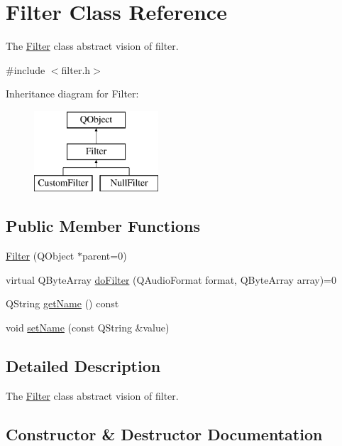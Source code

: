 \hypertarget{class_filter}{}\section{Filter Class Reference}
\label{class_filter}


The \hyperlink{class_filter}{Filter} class  abstract vision of filter.  




{\ttfamily \#include $<$filter.\+h$>$}

Inheritance diagram for Filter\+:\begin{figure}[H]
\begin{center}
\leavevmode
\includegraphics[height=3.000000cm]{class_filter}
\end{center}
\end{figure}
\subsection*{Public Member Functions}
\begin{DoxyCompactItemize}
\item 
\hyperlink{class_filter_a63401236b02925be21f62de930864aa7}{Filter} (Q\+Object $\ast$parent=0)
\item 
virtual Q\+Byte\+Array \hyperlink{class_filter_aa401218a142d916f84aafece09eac301}{do\+Filter} (Q\+Audio\+Format format, Q\+Byte\+Array array)=0
\item 
Q\+String \hyperlink{class_filter_a61e8bcd49b821b5e994216d87564b672}{get\+Name} () const
\item 
void \hyperlink{class_filter_ac6055d4347dd37c6f25c6c0290c50267}{set\+Name} (const Q\+String \&value)
\end{DoxyCompactItemize}


\subsection{Detailed Description}
The \hyperlink{class_filter}{Filter} class  abstract vision of filter. 

\subsection{Constructor \& Destructor Documentation}
\hypertarget{class_filter_a63401236b02925be21f62de930864aa7}{}\label{class_filter_a63401236b02925be21f62de930864aa7} 
